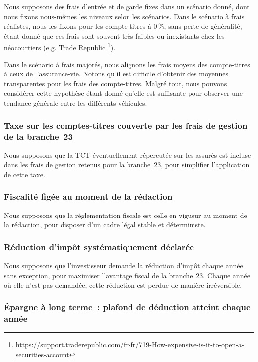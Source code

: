 ﻿\documentclass[12pt, a4paper]{article}
\begin{document}
Nous supposons des frais d'entrée et de garde fixes dans un scénario donné, dont nous
fixons nous-mêmes les niveaux selon les scénarios. Dans le scénario à frais
réalistes, nous les fixons pour les compte-titres à 0\,\%, sans perte de généralité,
étant donné que ces frais sont souvent très faibles ou inexistants chez les néocourtiers 
(e.g. Trade Republic \footnote{\url{https://support.traderepublic.com/fr-fr/719-How-expensive-is-it-to-open-a-securities-account}}). 

Dans le scénario à frais majorés, nous alignons les frais moyens des compte-titres
à ceux de l'assurance-vie. Notons qu'il est difficile d'obtenir des moyennes transparentes pour les frais
des compte-titres. Malgré tout, nous pouvons considérer cette hypothèse étant donné qu'elle est suffisante
pour observer une tendance générale entre les différents véhicules.

\subsubsection*{Taxe sur les comptes-titres couverte par les frais de gestion de la branche~23}

Nous supposons que la TCT éventuellement répercutée sur les assurés est incluse dans
les frais de gestion retenus pour la branche~23, pour simplifier l'application de cette taxe.

\subsubsection*{Fiscalité figée au moment de la rédaction}

Nous supposons que la réglementation fiscale est celle en vigueur au moment de la
rédaction, pour disposer d'un cadre légal stable et déterministe.

\subsubsection*{Réduction d'impôt systématiquement déclarée}

Nous supposons que l'investisseur demande la réduction d'impôt chaque année sans
exception, pour maximiser l'avantage fiscal de la branche~23. 
Chaque année où elle n'est pas demandée, cette réduction est perdue de manière irréversible. 

\subsubsection*{Épargne à long terme~: plafond de déduction atteint chaque année}
\end{document}
